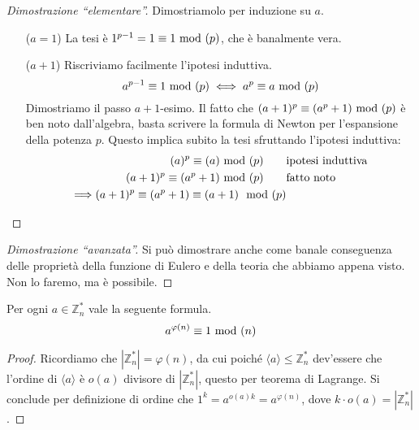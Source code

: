 \begin{proof}[Dimostrazione \enquote{elementare}]
	Dimostriamolo per induzione su $a$.
	\begin{enumerate}
		\item[($a=1$)]La tesi è $1^{p-1}=1\equiv1\ \mathrm{mod}\ (p)$, che è banalmente vera. 
		\item[($a+1$)] Riscriviamo facilmente l'ipotesi induttiva.
		\begin{equation*}
		a^{p-1}\equiv1\ \mathrm{mod}\ (p)\iff a^p\equiv a\ \mathrm{mod}\ (p)
		\end{equation*}
		Dimostriamo il passo $a+1$-esimo. Il fatto che $(a+1)^p\equiv(a^p+1)\ \mathrm{mod}\ (p)$ è ben noto dall'algebra, basta scrivere la formula di Newton per l'espansione della potenza $p$. Questo implica subito la tesi sfruttando l'ipotesi induttiva:
		\begin{align*}
		(a)^{p}\equiv(a)\ \mathrm{mod}\ (p) \ \ \ \ \ \ &\text{ipotesi induttiva}\\
		(a+1)^p\equiv(a^p+1)\ \mathrm{mod}\ (p) \ \ \ \ \ \ &\text{fatto noto}\\
		\Longrightarrow (a+1)^{p}\equiv (a^p+1) \equiv (a+1)\mod(p)
		\end{align*}
	\end{enumerate}
\end{proof}
\begin{proof}[Dimostrazione \enquote{avanzata}] 
	Si può dimostrare anche come banale conseguenza delle proprietà della funzione di Eulero e della teoria che abbiamo appena visto. \\ Non lo faremo, ma è possibile. 
\end{proof}
\begin{teorema}
	Per ogni $a\in\mathbb{Z}_n^*$ vale la seguente formula.
	\begin{equation*}
	a^{\varphi(n)}\equiv 1 \ \mathrm{mod}\ (n)
	\end{equation*}
\end{teorema}
\begin{proof}
	Ricordiamo che $|\mathbb{Z}^*_n| = \varphi(n)$, da cui poiché $\langle a\rangle \leq \mathbb{Z}^*_n$ dev'essere che l'ordine di $\langle a\rangle$ è $o(a)$ divisore di $ |\mathbb{Z}^*_n|$, questo per teorema di Lagrange. Si conclude per definizione di ordine che $1^k = a^{o(a)k} = a^{\varphi(n)}$, dove $k \cdot o(a)=|\mathbb{Z}^*_n|$. 
\end{proof}




